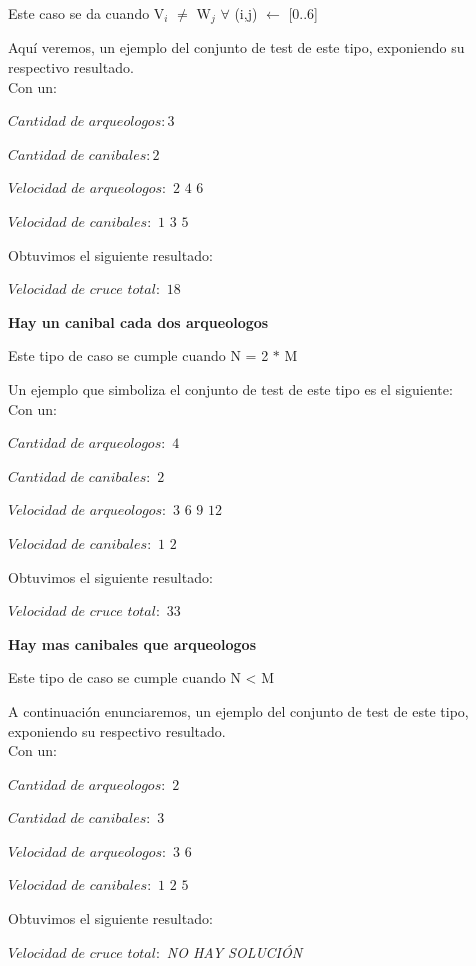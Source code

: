 Este caso se da cuando V$_{i}$ $\neq$ W$_{j}$ $\forall$ (i,j)  $\gets$ [0..6] 

Aqu\'i veremos, un ejemplo del conjunto de test de este tipo, exponiendo su respectivo resultado.\\

 Con un:

$Cantidad$ $de$ $arqueologos: 3 $ 

$Cantidad$ $de$ $canibales: 2 $ 

$Velocidad$ $de$ $arqueologos:$ $2$ $4$ $6 $

$Velocidad$ $de$ $canibales:$ $1$ $3$ $5 $

  Obtuvimos el siguiente resultado:

$Velocidad$ $de$ $cruce$ $total: $ $18$\\


\begin{center}
 \textbf{Hay un canibal cada dos arqueologos}
\end{center}

Este tipo de caso se cumple cuando N = 2 $\ast$ M

Un ejemplo que simboliza el conjunto de test de este tipo es el siguiente:\\

 Con un:

$Cantidad$ $de$ $arqueologos:$ $4 $

$Cantidad$ $de$ $canibales:$ $2$

$Velocidad$ $de$ $arqueologos:$ $3$ $6$ $9$ $12$

$Velocidad$ $de$ $canibales:$ $1$ $2$ 


  Obtuvimos el siguiente resultado:

$Velocidad$ $de$ $cruce$ $total: $ $33$



\begin{center}
 \textbf{Hay mas canibales que arqueologos}
\end{center}

Este tipo de caso se cumple cuando N < M

A continuaci\'on enunciaremos, un ejemplo del conjunto de test de este tipo, exponiendo su respectivo resultado.\\

 Con un:

$Cantidad$ $de$ $arqueologos:$ $2 $

$Cantidad$ $de$ $canibales:$ $3$

$Velocidad$ $de$ $arqueologos:$ $3$ $6$

$Velocidad$ $de$ $canibales:$ $1$ $2$ $5$

  Obtuvimos el siguiente resultado:

$Velocidad$ $de$ $cruce$ $total:$ \textit{NO HAY SOLUCI\'ON} \\


